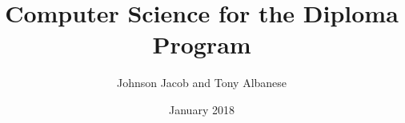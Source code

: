\documentclass[a4paper,12pt]{book}
\begin{document}
\author{Johnson Jacob and Tony Albanese}
\title{Computer Science for the Diploma Program}
\date{January 2018}

\maketitle




\end{document}
